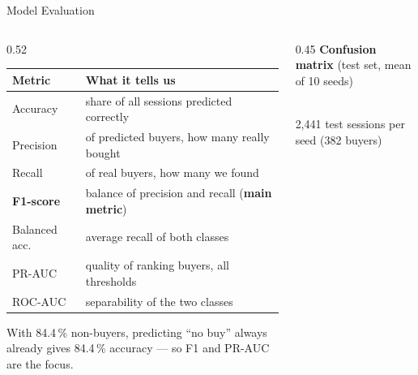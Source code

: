 \documentclass[aspectratio=169,11pt]{beamer}
\begin{document}
\begin{frame}{Model Evaluation}
  \begin{columns}[c,onlytextwidth]
    \begin{column}{0.52\textwidth}\footnotesize
      \begin{tabular}{@{}p{22mm}p{50mm}@{}}
        \toprule
        \textbf{Metric} & \textbf{What it tells us} \\
        \midrule
        Accuracy & share of all sessions predicted correctly \\
        Precision & of predicted buyers, how many really bought \\
        Recall & of real buyers, how many we found \\
        \textbf{F1-score} & balance of precision and recall (\textbf{main metric}) \\
        Balanced acc. & average recall of both classes \\
        PR-AUC & quality of ranking buyers, all thresholds \\
        ROC-AUC & separability of the two classes \\
        \bottomrule
      \end{tabular}
      \vspace{4pt}

      {\scriptsize\color{muted}With 84.4\,\% non-buyers, predicting ``no buy'' always already gives 84.4\,\% accuracy --- so F1 and PR-AUC are the focus.}
    \end{column}
    \begin{column}{0.45\textwidth}
      \centering
      {\footnotesize\textbf{Confusion matrix} (test set, mean of 10 seeds)}\\[4pt]
      \\[2pt]
      {\tiny\color{muted}2,441 test sessions per seed (382 buyers)}
    \end{column}
  \end{columns}
\end{frame}
\end{document}
